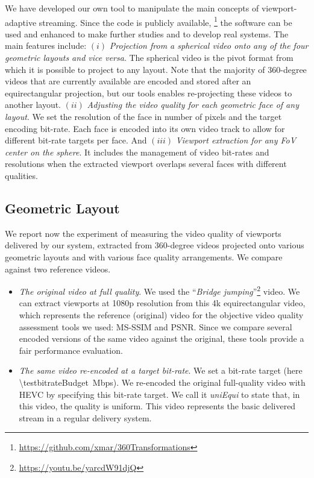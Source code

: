 We have developed our own tool to manipulate the main
concepts of viewport-adaptive streaming. Since the code is publicly
available, \footnote{\url{https://github.com/xmar/360Transformations}}
the software can be used and enhanced to make further studies and to
develop real systems. The main features include: $(i)$
\emph{Projection from a spherical video onto any of the four geometric
layouts and vice versa}. The spherical video is the pivot format from
which it is possible to project to any layout. Note that the majority
of 360-degree videos that are currently available are encoded and
stored after an equirectangular projection, but our tools enables
re-projecting these videos to another layout. $(ii)$ \emph{Adjusting
the video quality for each geometric face of any layout}. We set the
resolution of the face in number of pixels and the target encoding
bit-rate. Each face is encoded into its own video track to allow for
different bit-rate targets per face. And $(iii)$ \emph{Viewport
extraction for any \ac{FoV} center on the sphere}. It includes the
management of video bit-rates and resolutions when the extracted
viewport overlaps several faces with different qualities.

\subsection{Geometric Layout}

We report now the experiment of measuring the video quality of
viewports delivered by our system, extracted from 360-degree videos
projected onto various geometric layouts and with various face quality
arrangements. We compare against two reference videos.
\begin{itemize}[leftmargin=7pt, itemindent=0pt, topsep=2pt, itemsep=0pt]

   \item \emph{The original video at full quality}. We used the
   ``\emph{Bridge
   jumping}''\footnote{\url{https://youtu.be/yarcdW91djQ}} video. We
   can extract viewports at 1080p resolution from this 4k
   equirectangular video, which represents the reference (original)
   video for the objective video quality assessment tools we used:
   \ac{MS-SSIM} and \ac{PSNR}. Since we compare several encoded
   versions of the same video against the original, these tools
   provide a fair performance evaluation.

   \item \emph{The same video re-encoded at a target bit-rate}. We set
   a bit-rate target (here \SI{\testbitrateBudget}{\mega bps}). We
   re-encoded the original full-quality video with \ac{HEVC} by
   specifying this bit-rate target. We call it \emph{uniEqui} to state
   that, in this video, the quality is uniform. This video represents
   the basic delivered stream in a regular delivery system.
\end{itemize}

